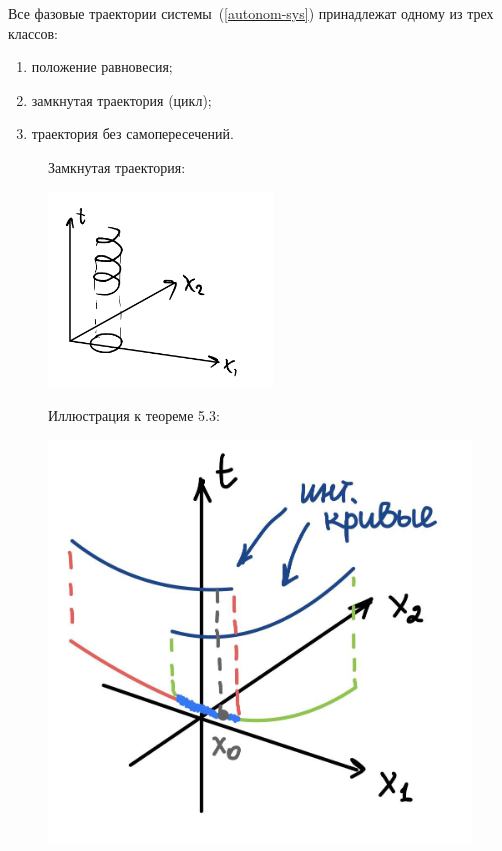 \begin{theorem}[б/д]
Все фазовые траектории системы~(\ref{autonom-sys}) принадлежат одному из трех классов:
\begin{enumerate}
    \item положение равновесия;
    \item замкнутая траектория (цикл);
    \item траектория без самопересечений.
\end{enumerate}
\end{theorem}
\begin{figure}[h]
    \begin{minipage}[h]{0.5\linewidth}
    Замкнутая траектория:
\begin{center}
    \includegraphics[width=0.5\linewidth]{images/cycle.png}
\end{center}
    \end{minipage}
    \hspace{-4ex}
    \begin{minipage}[h]{0.5\linewidth}
Иллюстрация к теореме 5.3:
\begin{center}
    \includegraphics[width=0.5\linewidth]{images/th2.jpg}
\end{center}
    \end{minipage}
\end{figure}



